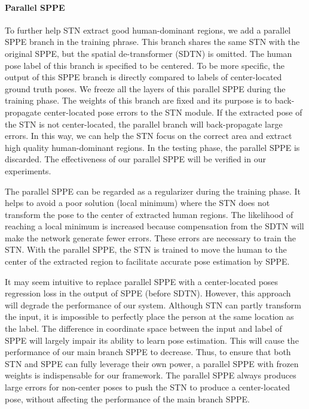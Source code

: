 \documentclass[10pt,twocolumn,letterpaper]{article}
\begin{document}
\paragraph{Parallel SPPE}
To further help STN extract good human-dominant regions, we add a parallel SPPE branch in the training phrase. This branch shares the same STN with the original SPPE, but the spatial de-transformer (SDTN) is omitted. The human pose label of this branch is specified to be centered. To be more specific, the output of this SPPE branch is directly compared to labels of center-located ground truth poses. We freeze all the layers of this parallel SPPE during the training phase. The weights of this branch are fixed and its purpose is to back-propagate center-located pose errors to the STN module. If the extracted pose of the STN is not center-located, the parallel branch will back-propagate large errors. In this way, we can help the STN focus on the correct area and extract high quality human-dominant regions. In the testing phase, the parallel SPPE is discarded. The effectiveness of our parallel SPPE will be verified in our experiments.

\vspace{2mm}
 The parallel SPPE can be regarded as a regularizer during the training phase. It helps to avoid a poor solution (local minimum) where the STN does not transform the pose to the center of extracted human regions. The likelihood of reaching a local minimum is increased because compensation from the SDTN will make the network generate fewer errors. These errors are necessary to train the STN. With the parallel SPPE, the STN is trained to move the human to the center of the extracted region to facilitate accurate pose estimation by SPPE.

It may seem intuitive to replace parallel SPPE with a center-located poses regression loss in the output of SPPE (before SDTN). However, this approach will degrade the performance of our system.  Although STN can partly transform the input, it is impossible to perfectly place the person at the same location as the label. The difference in coordinate space between the input and label of SPPE will largely impair its ability to learn pose estimation. This will cause the performance of our main branch SPPE to decrease. Thus, to ensure that both STN and SPPE can fully leverage their own power, a parallel SPPE with frozen weights is indispensable for our framework. The parallel SPPE always produces large errors for non-center poses to push the STN to produce a center-located pose, without affecting the performance of the main branch SPPE.
\end{document}
